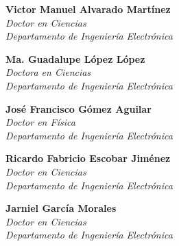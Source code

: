 %
%


\NewDocumentCommand\CommitteePageTitle{m}{
	\vspace*{75pt}%
	\IfPackageLoadedTF{microtype}
		{\textls*{\Large\textbf{\MakeUppercase{#1}}}}
		{{\Large\textbf{\MakeUppercase{#1}}}}%
	\pdfbookmark[0]{#1}{Committee}%
	\vspace*{10pt}%
}

\NewDocumentCommand\Role{m}{
	\vspace*{50pt}%
	\IfPackageLoadedTF{microtype}
		{\textls*{\large{\textsc{#1}}}}
		{{\large\textsc{#1}}}%
	\vspace*{12pt}%
}

\begin{flushright}



 \textbf{Victor Manuel Alvarado Martínez} \\
 {\itshape
 Doctor en Ciencias \\
 Departamento de Ingeniería Electrónica \\
 }


\textbf{Ma. Guadalupe López López} \\
{\itshape
	Doctora en Ciencias \\
	Departamento de Ingeniería Electrónica \\
}



 \textbf{José Francisco Gómez Aguilar} \\
 {\itshape
   Doctor en Física \\
   Departamento de Ingeniería Electrónica \\[18pt]
 }

 \textbf{Ricardo Fabricio Escobar Jiménez}\\
 {\itshape
   Doctor en Ciencias \\
   Departamento de Ingeniería Electrónica \\[18pt]
 }

 \textbf{Jarniel García Morales} \\
 {\itshape
   Doctor en Ciencias \\
   Departamento de Ingeniería Electrónica \\
 }

\end{flushright}

\cleardoublepage
